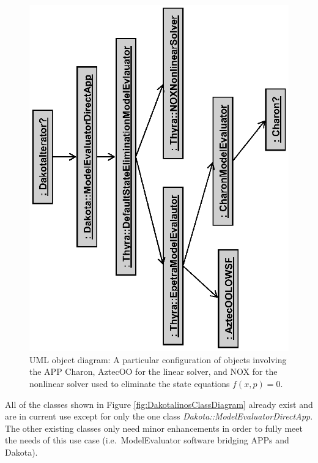 \documentclass[pdf,ps2pdf,11pt]{SANDreport}
\begin{document}
{\bsinglespace
\begin{figure}
\begin{center}
\includegraphics*[angle=270,scale=0.75
]{DakotalinosObjectDiagram1}
\end{center}
\caption{
\label{fig:DakotalinosObjectDiagram1}
UML object diagram: A particular configuration of objects involving the APP
Charon, AztecOO for the linear solver, and NOX for the nonlinear solver used
to eliminate the state equations $f(x,p)=0$.}
\end{figure}
\esinglespace}


All of the classes shown in Figure {}\ref{fig:DakotalinosClassDiagram} already
exist and are in current use except for only the one class
{}\textit{Dakota::\-Model\-Evaluator\-Direct\-App}.  The other existing
classes only need minor enhancements in order to fully meet the needs of this
use case (i.e.\ ModelEvaluator software bridging APPs and Dakota).
\end{document}
